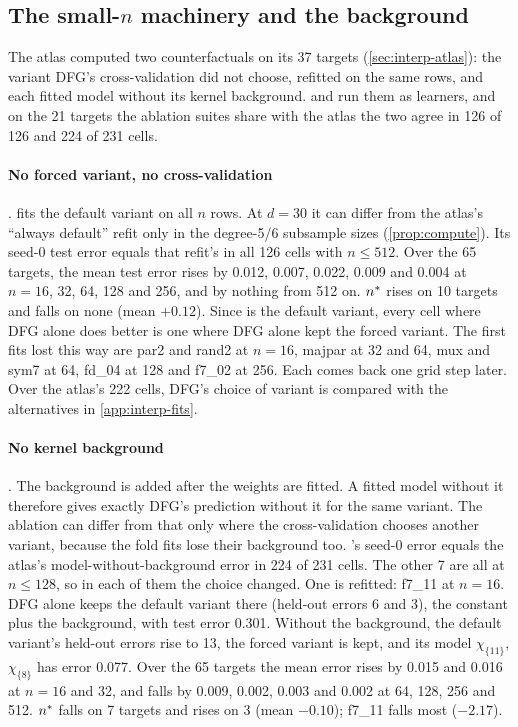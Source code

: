 \subsection{The small-\texorpdfstring{$n$}{n} machinery and the background}\label{sec:abl-smalln}

The atlas computed two counterfactuals on its 37 targets (\cref{sec:interp-atlas}): the variant DFG's cross-validation did not choose, refitted on the same rows, and each fitted model without its kernel background.  and  run them as learners, and on the 21 targets the ablation suites share with the atlas the two agree in 126 of 126 and 224 of 231 cells.

\paragraph{No forced variant, no cross-validation} .  fits the default variant on all $n$ rows. At $d=30$ it can differ from the atlas's ``always default'' refit only in the degree-5/6 subsample sizes (\cref{prop:compute}). Its seed-0 test error equals that refit's in all 126 cells with $n\le512$. Over the 65 targets, the mean test error rises by 0.012, 0.007, 0.022, 0.009 and 0.004 at $n=16$, 32, 64, 128 and 256, and by nothing from 512 on. $n^{*}$ rises on 10 targets and falls on none (mean $+0.12$). Since  is the default variant, every cell where DFG alone does better is one where DFG alone kept the forced variant. The first fits lost this way are par2 and rand2 at $n=16$, majpar at 32 and 64, mux and sym7 at 64, fd\_04 at 128 and f7\_02 at 256. Each comes back one grid step later. Over the atlas's 222 cells, DFG's choice of variant is compared with the alternatives in \cref{app:interp-fits}.

\paragraph{No kernel background} . The background is added after the weights are fitted. A fitted model without it therefore gives exactly DFG's prediction without it for the same variant. The ablation can differ from that only where the cross-validation chooses another variant, because the fold fits lose their background too. 's seed-0 error equals the atlas's model-without-background error in 224 of 231 cells. The other 7 are all at $n\le128$, so in each of them the choice changed. One is refitted: f7\_11 at $n=16$. DFG alone keeps the default variant there (held-out errors 6 and 3), the constant plus the background, with test error 0.301. Without the background, the default variant's held-out errors rise to 13, the forced variant is kept, and its model $\chi_{\{11\}}$, $\chi_{\{8\}}$ has error 0.077. Over the 65 targets the mean error rises by 0.015 and 0.016 at $n=16$ and 32, and falls by 0.009, 0.002, 0.003 and 0.002 at 64, 128, 256 and 512. $n^{*}$ falls on 7 targets and rises on 3 (mean $-0.10$); f7\_11 falls most ($-2.17$).


